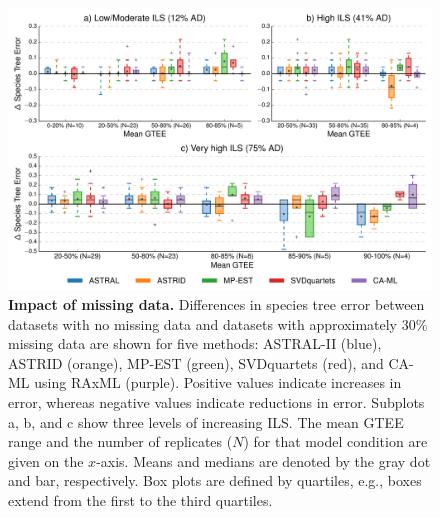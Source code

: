\begin{figure}[!h]
\centering
\includegraphics[width=1.0\textwidth]{figures/gene-filtering-fig2.pdf}
\caption{{\bf Impact of missing data.} Differences in species tree error between datasets with no missing data and datasets with approximately 30\% missing data are shown for five methods: ASTRAL-II (blue), ASTRID (orange), MP-EST (green), SVDquartets (red), and CA-ML using RAxML (purple). 
Positive values indicate increases in error, whereas negative values indicate reductions in error. 
Subplots a, b, and c show three levels of increasing ILS. 
The mean GTEE range and the number of replicates ($N$) for that model condition are given on the $x$-axis. 
Means and medians are denoted by the gray dot and bar, respectively. 
Box plots are defined by quartiles, e.g., boxes extend from the first to the third quartiles.}
\label{fig:include-2}
\end{figure}


